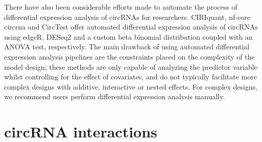 \documentclass[journal,review,submit,pdftex,moreauthors]{Definitions/mdpi}
\begin{document}
There have also been considerable efforts made to automate the process of differential expression analysis of circRNAs for researchers. CIRIquant, nf-core circrna and CircTest offer automated differential expression analysis of circRNAs using edgeR, DESeq2 and a custom beta binomial distribution coupled with an ANOVA test, respectively. The main drawback of using automated differential expression analysis pipelines are the constraints placed on the complexity of the model design; these methods are only capable of analyzing the predictor variable whilst controlling for the effect of covariates, and do not typically facilitate more complex designs with additive, interactive or nested effects. For complex designs, we recommend users perform differential expression analysis manually.

\section{circRNA interactions}
\end{document}
